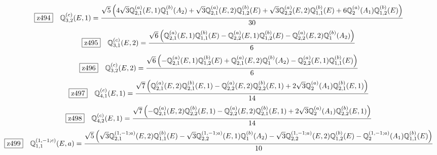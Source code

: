 \documentclass[fleqn,10pt,landscape]{jsarticle}
\begin{document}
\begin{dmath*}
\hspace*{3mm}\fbox{z494}\quad \mathbb{Q}_{3,2}^{(c)}(E,1)=\frac{\sqrt{5} \left(4 \sqrt{3} \mathbb{Q}_{2,1}^{(a)}(E,1) \mathbb{Q}_{1}^{(b)}(A_{2}) + \sqrt{3} \mathbb{Q}_{2,1}^{(a)}(E,2) \mathbb{Q}_{1,2}^{(b)}(E) + \sqrt{3} \mathbb{Q}_{2,2}^{(a)}(E,2) \mathbb{Q}_{1,1}^{(b)}(E) + 6 \mathbb{Q}_{2}^{(a)}(A_{1}) \mathbb{Q}_{1,2}^{(b)}(E)\right)}{30}
\end{dmath*}
\begin{dmath*}
\hspace*{3mm}\fbox{z495}\quad \mathbb{Q}_{3,1}^{(c)}(E,2)=\frac{\sqrt{6} \left(\mathbb{Q}_{2,1}^{(a)}(E,1) \mathbb{Q}_{1,1}^{(b)}(E) - \mathbb{Q}_{2,2}^{(a)}(E,1) \mathbb{Q}_{1,2}^{(b)}(E) - \mathbb{Q}_{2,2}^{(a)}(E,2) \mathbb{Q}_{1}^{(b)}(A_{2})\right)}{6}
\end{dmath*}
\begin{dmath*}
\hspace*{3mm}\fbox{z496}\quad \mathbb{Q}_{3,2}^{(c)}(E,2)=\frac{\sqrt{6} \left(- \mathbb{Q}_{2,1}^{(a)}(E,1) \mathbb{Q}_{1,2}^{(b)}(E) + \mathbb{Q}_{2,1}^{(a)}(E,2) \mathbb{Q}_{1}^{(b)}(A_{2}) - \mathbb{Q}_{2,2}^{(a)}(E,1) \mathbb{Q}_{1,1}^{(b)}(E)\right)}{6}
\end{dmath*}
\begin{dmath*}
\hspace*{3mm}\fbox{z497}\quad \mathbb{Q}_{4,1}^{(c)}(E,1)=\frac{\sqrt{7} \left(\mathbb{Q}_{2,1}^{(a)}(E,2) \mathbb{Q}_{2,1}^{(b)}(E,1) - \mathbb{Q}_{2,2}^{(a)}(E,2) \mathbb{Q}_{2,2}^{(b)}(E,1) + 2 \sqrt{3} \mathbb{Q}_{2}^{(a)}(A_{1}) \mathbb{Q}_{2,1}^{(b)}(E,1)\right)}{14}
\end{dmath*}
\begin{dmath*}
\hspace*{3mm}\fbox{z498}\quad \mathbb{Q}_{4,2}^{(c)}(E,1)=\frac{\sqrt{7} \left(- \mathbb{Q}_{2,1}^{(a)}(E,2) \mathbb{Q}_{2,2}^{(b)}(E,1) - \mathbb{Q}_{2,2}^{(a)}(E,2) \mathbb{Q}_{2,1}^{(b)}(E,1) + 2 \sqrt{3} \mathbb{Q}_{2}^{(a)}(A_{1}) \mathbb{Q}_{2,2}^{(b)}(E,1)\right)}{14}
\end{dmath*}
\begin{dmath*}
\hspace*{3mm}\fbox{z499}\quad \mathbb{Q}_{1,1}^{(1,-1;c)}(E,a)=\frac{\sqrt{5} \left(\sqrt{3} \mathbb{Q}_{2,1}^{(1,-1;a)}(E,2) \mathbb{Q}_{1,1}^{(b)}(E) - \sqrt{3} \mathbb{Q}_{2,2}^{(1,-1;a)}(E,1) \mathbb{Q}_{1}^{(b)}(A_{2}) - \sqrt{3} \mathbb{Q}_{2,2}^{(1,-1;a)}(E,2) \mathbb{Q}_{1,2}^{(b)}(E) - \mathbb{Q}_{2}^{(1,-1;a)}(A_{1}) \mathbb{Q}_{1,1}^{(b)}(E)\right)}{10}
\end{dmath*}
\end{document}
